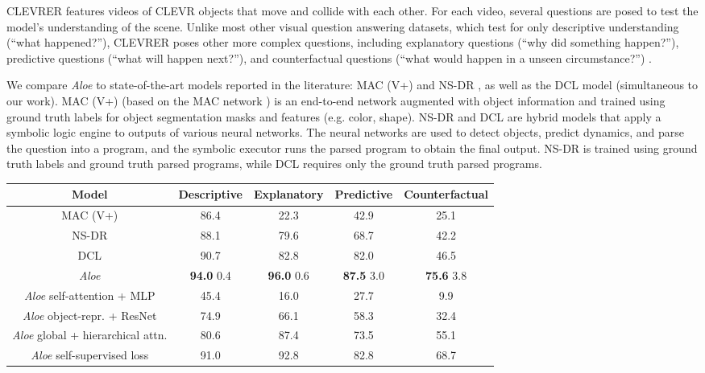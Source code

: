 \documentclass{article}
\newcommand{\Model}{\emph{Aloe}}
\begin{document}
CLEVRER features videos of CLEVR objects \citep{Johnson2016clevr}
that move and collide with each other.
For each video, several questions are posed to test the model's understanding of the scene.
Unlike most other visual question answering datasets, which test for only descriptive understanding (``what happened?''),
CLEVRER poses other more complex questions, including 
explanatory questions (``why did something happen?''), predictive questions (``what will happen next?''),
and counterfactual questions (``what would happen in a unseen circumstance?'') \citep{clevrer}.


We compare \Model{} to 
state-of-the-art models reported in the literature:
MAC (V+) and \mbox{NS-DR} \citep{clevrer},
as well as the DCL model \citep{chen2021grounding} (simultaneous to our work).
MAC (V+) (based on the MAC network \citep{hudson2018compositional}) is an end-to-end network
augmented with object information and trained using ground truth labels
for object segmentation masks and features (e.g. color, shape).
NS-DR and DCL are hybrid models that apply a symbolic logic engine to outputs of various neural networks. The neural networks are used to detect objects, predict dynamics, and parse the question into a program,
and the symbolic executor runs the parsed program to obtain the final output.
NS-DR is trained using ground truth labels
and ground truth parsed programs,
while DCL requires only the ground truth parsed programs.


\begin{table*}[t]
    \centering
    \begin{tabular}{c|c|c|c|c}
         Model & Descriptive & Explanatory & Predictive & Counterfactual \\
         \hline
         MAC (V+) & 86.4 & 22.3 & 42.9 & 25.1\\
         NS-DR & 88.1 & 79.6 & 68.7 & 42.2  \\
         DCL & 90.7 & 82.8 & 82.0 & 46.5 \\
         \hline
         \Model{} & \textbf{94.0}  0.4 & \textbf{96.0}  0.6 & \textbf{87.5}  3.0 & \textbf{75.6}  3.8 \\
         \hline
         \Model{}  self-attention + MLP &  45.4 & 16.0 & 27.7 & 9.9 \\
         \Model{}  object-repr. + ResNet & 74.9	     & 66.1         & 58.3         & 32.4 \\
         \Model{}  global + hierarchical attn. & 80.6 & 87.4  & 73.5         & 55.1 \\
         \Model{}  self-supervised loss & 91.0 & 92.8 & 82.8 & 68.7
    \end{tabular}
    \caption{Performance (per question accuracy) on CLEVRER of \Model{} compared to results from literature
    and to ablations: 1) MLP instead of self-attention; 2) ResNet superpixels instead of MONet objects; 3) hierarchical frame-level and intra-frame attention instead of global cross-frame object attention; 4) no auxiliary loss.
    }
    \label{table:clevrer-baseline-comparisons}
\end{table*}
\end{document}
